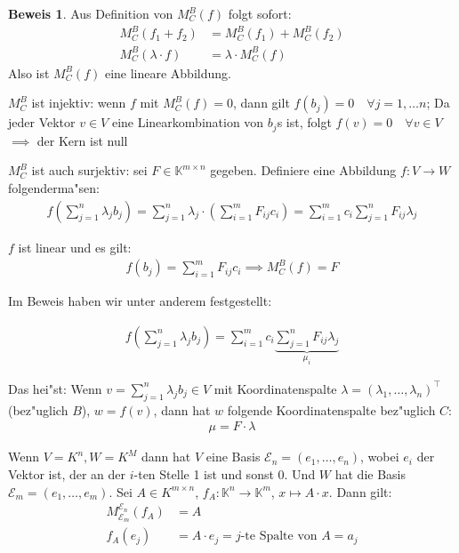 \documentclass[oneside,fontsize=11pt,paper=a4,BCOR=0mm,DIV=12,automark,headsepline]{scrbook}
\theoremstyle{remark}
\theoremstyle{definition}
\theoremstyle{definition}
\newtheorem*{prof}{Beweis}
\theoremstyle{remark}
\begin{document}
\begin{prof}
Aus Definition von \(M_C^B(f)\) folgt sofort:
\begin{align*}
M^B_C(f_1 + f_2) &= M_C^B(f_1) + M_C^B(f_2)\\
M^B_C(\lambda\cdot f) &= \lambda\cdot M_C^B(f)
\end{align*}
Also ist \(M_C^B(f)\) eine lineare
Abbildung.

\(M_C^B\) ist injektiv: wenn \(f\) mit \(M^B_C(f) = 0\), dann gilt \(f(b_j) = 0\quad\forall j= 1,\dots n\); Da jeder Vektor \(v \in V\) eine Linearkombination von \(b_j\)s ist, folgt \(f(v) = 0 \quad\forall v \in V\) \(\implies\) der Kern ist null

\(M^B_C\) ist auch surjektiv: sei \(F\in \mathbb{K}^{m\times n}\) gegeben. Definiere eine Abbildung \(f: V\to W\) folgenderma"sen:
\begin{align*}
f\left(\sum_{j=1}^n\lambda_jb_j\right) = \sum_{j=1}^n\lambda_j\cdot\left(\sum_{i=1}^mF_{ij}c_i\right)=\sum_{i=1}^mc_i\sum_{j=1}^nF_{ij}\lambda_j
\end{align*}

\(f\) ist linear und es gilt:
\begin{align*}
f(b_j) = \sum_{i=1}^mF_{ij}c_i \implies M^B_C(f) = F
\end{align*}
\end{prof}

Im Beweis haben wir unter anderem festgestellt:
\begin{relation}
\begin{align*}
f\left(\sum_{j=1}^n\lambda_jb_j\right)=\sum_{i=1}^mc_i\underbrace{\sum_{j=1}^nF_{ij}\lambda_j}_{\mu_i}
\end{align*}

Das hei"st: Wenn \(v=\sum_{j=1}^n\lambda_jb_j\in V\) mit Koordinatenspalte \(\lambda = (\lambda_1,\dots,\lambda_n)^\top\) (bez"uglich \(B\)), \(w = f(v)\), dann hat \(w\) folgende Koordinatenspalte bez"uglich \(C\):
\begin{align}
\mu = F\cdot \lambda
\end{align}
\end{relation}

\begin{exa}
Wenn \(V=K^n, W=K^M\) dann hat \(V\) eine Basis \(\mathcal{E}_n = (e_1, \dots, e_n)\), wobei \(e_i\) der Vektor ist, der an der \(i\)-ten Stelle 1 ist und sonst 0. Und \(W\) hat die Basis \(\mathcal{E}_m = (e_1, \dots, e_m)\).
Sei \(A\in K^{m\times n }\), \(f_A: \mathbb{K}^n\to \mathbb{K}^m\), \(x \mapsto A\cdot x\). Dann gilt:
\begin{align*}
M^{\mathcal{E}_n}_{\mathcal{E}_m}(f_A) &= A\\
f_A(e_j) &= A\cdot e_j = j\text{-te Spalte von } A = a_j
\end{align*}
\end{exa}
\end{document}
